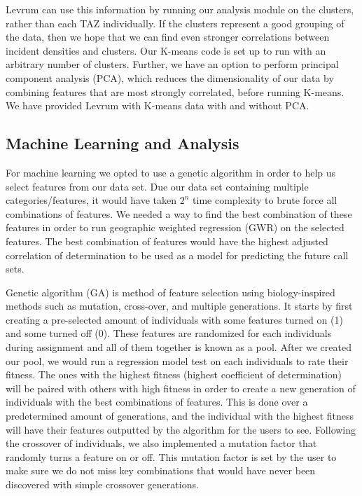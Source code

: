 \documentclass[onecolumn, draftclsnofoot,10pt, compsoc]{IEEEtran}
\begin{document}
\begin{singlespace}
Levrum can use this information by running our analysis module on the clusters, rather than each TAZ individually. If the clusters represent a good grouping of the data, then we hope that we can find even stronger correlations between incident densities and clusters. Our K-means code is set up to run with an arbitrary number of clusters. Further, we have an option to perform principal component analysis (PCA), which reduces the dimensionality of our data by combining features that are most strongly correlated, before running K-means. We have provided Levrum with K-means data with and without PCA.



\subsection{Machine Learning and Analysis}\label{ml}
For machine learning we opted to use a genetic algorithm in order to help us select features from our data set.
Due our data set containing  multiple categories/features, it would have taken \(2^n\) time complexity to brute force all combinations of features.
We needed a way to find the best combination of these features in order to run geographic weighted regression (GWR) on the selected features.
The best combination of features would have the highest adjusted correlation of determination to be used as a model for predicting the future call sets.

Genetic algorithm (GA) is method of feature selection using biology-inspired methods such as mutation, cross-over, and multiple generations. It starts by first creating a pre-selected amount of individuals with some features turned on (1) and some turned off (0). 
These features are randomized for each individuals during assignment and all of them together is known as a pool. 
After we created our pool, we would run a regression model test on each individuals to rate their fitness.
The ones with the highest fitness (highest coefficient of determination) will be paired with others with high fitness in order to create a new generation of individuals with the best combinations of features.
This is done over a predetermined amount of generations, and the individual with the highest fitness will have their features outputted by the algorithm for the users to see.
Following the crossover of individuals, we also implemented a mutation factor that randomly turns a feature on or off.
This mutation factor is set by the user to make sure we do not miss key combinations that would have never been discovered with simple crossover generations.


\end{singlespace}
\end{document}
